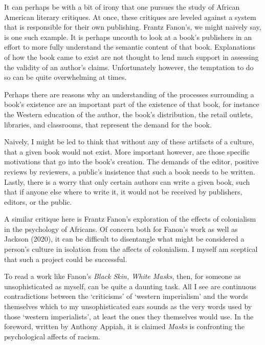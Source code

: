 \documentclass[
  letterpaper,
  DIV=11,
  numbers=noendperiod]{scrreprt}
\begin{document}
\begin{tcolorbox}[enhanced jigsaw, arc=.35mm, breakable, rightrule=.15mm, colback=white, colframe=quarto-callout-important-color-frame, bottomrule=.15mm, leftrule=.75mm, opacityback=0, toprule=.15mm, left=2mm]
\begin{tcolorbox}[enhanced jigsaw, arc=.35mm, breakable, rightrule=.15mm, colback=white, colframe=quarto-callout-tip-color-frame, bottomrule=.15mm, leftrule=.75mm, opacityback=0, toprule=.15mm, left=2mm]
It can perhaps be with a bit of irony that one pursues the study of
African American literary critiques. At once, these critiques are
leveled against a system that is responsible for their own publishing.
Frantz Fanon's, we might naively say, is one such example. It is perhaps
uncouth to look at a book's publishers in an effort to more fully
understand the semantic content of that book. Explanations of how the
book came to exist are not thought to lend much support in assessing the
validity of an author's claims. Unfortunately however, the temptation to
do so can be quite overwhelming at times.

Perhaps there are reasons why an understanding of the processes
surrounding a book's existence are an important part of the existence of
that book, for instance the Western education of the author, the book's
distribution, the retail outlets, libraries, and classrooms, that
represent the demand for the book.

Naively, I might be led to think that without any of these artifacts of
a culture, that a given book would not exist. More important however,
are those specific motivations that go into the book's creation. The
demands of the editor, positive reviews by reviewers, a public's
insistence that such a book needs to be written. Lastly, there is a
worry that only certain authors can write a given book, such that if
anyone else where to write it, it would not be received by publishers,
editors, or the public.

A similar critique here is Frantz Fanon's exploration of the effects of
colonialism in the psychology of Africans. Of concern both for Fanon's
work as well as Jackson (2020), it can be difficult to disentangle what
might be considered a person's culture in isolation from the affects of
colonialism. I myself am sceptical that such a project could be
successful.

To read a work like Fanon's \emph{Black Skin, White Masks}, then, for
someone as unsophisticated as myself, can be quite a daunting task. All
I see are continuous contradictions between the `criticisms' of `western
imperialism' and the words themselves which to my unsophisticated ears
sounds as the very words used by those `western imperialists', at least
the ones they themselves would use. In the foreword, written by Anthony
Appiah, it is claimed \emph{Masks} is confronting the psychological
affects of racism.


\end{tcolorbox}
\end{tcolorbox}
\end{document}
